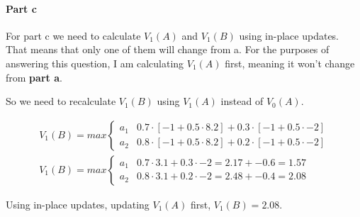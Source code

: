 \documentclass[12pt]{article}
\begin{document}
\paragraph{Part c} For part c we need to calculate $V_1(A)$ and $V_1(B)$ using in-place updates. That means that only one of them will change from a. For the purposes of answering this question, I am calculating $V_1(A)$ first, meaning it won't change from \textbf{part a}.

So we need to recalculate $V_1(B)$ using $V_1(A)$ instead of $V_0(A)$.

\begin{gather*}
  V_1(B) = max \begin{cases}
    a_1 & 0.7 \cdot [-1 + 0.5 \cdot 8.2] + 0.3 \cdot [-1 + 0.5 \cdot -2] \\
    a_2 & 0.8 \cdot [-1 + 0.5 \cdot 8.2] + 0.2 \cdot [-1 + 0.5 \cdot -2]
  \end{cases} \\
  V_1(B) = max \begin{cases}
    a_1 & 0.7 \cdot 3.1 + 0.3 \cdot -2 = 2.17 + -0.6 = 1.57 \\
    a_2 & 0.8 \cdot 3.1 + 0.2 \cdot -2 = 2.48 + -0.4 = 2.08
  \end{cases}
\end{gather*}

Using in-place updates, updating $V_1(A)$ first, $V_1(B) = 2.08$.



\end{document}
